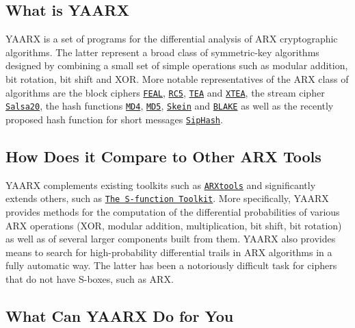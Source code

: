 \hypertarget{index_what_sec}{}\subsection{\-What is Y\-A\-A\-R\-X}\label{index_what_sec}
\-Y\-A\-A\-R\-X is a set of programs for the differential analysis of \-A\-R\-X cryptographic algorithms. \-The latter represent a broad class of symmetric-\/key algorithms designed by combining a small set of simple operations such as modular addition, bit rotation, bit shift and \-X\-O\-R. \-More notable representatives of the \-A\-R\-X class of algorithms are the block ciphers \href{https://en.wikipedia.org/wiki/FEAL}{\tt \-F\-E\-A\-L}, \href{https://en.wikipedia.org/wiki/RC5}{\tt \-R\-C5}, \href{https://en.wikipedia.org/wiki/Tiny_Encryption_Algorithm}{\tt \-T\-E\-A} and \href{https://en.wikipedia.org/wiki/XTEA}{\tt \-X\-T\-E\-A}, the stream cipher \href{https://en.wikipedia.org/wiki/Salsa20}{\tt \-Salsa20}, the hash functions \href{https://en.wikipedia.org/wiki/MD4}{\tt \-M\-D4}, \href{https://en.wikipedia.org/wiki/MD5}{\tt \-M\-D5}, \href{https://en.wikipedia.org/wiki/Skein_%28hash_function%29}{\tt \-Skein} and \href{https://en.wikipedia.org/wiki/BLAKE_%28hash_function%29}{\tt \-B\-L\-A\-K\-E} as well as the recently proposed hash function for short messages \href{https://131002.net/siphash/}{\tt \-Sip\-Hash}.\hypertarget{index_why_sec}{}\subsection{\-How Does it Compare to Other A\-R\-X Tools}\label{index_why_sec}
\-Y\-A\-A\-R\-X complements existing toolkits such as \href{http://www.di.ens.fr/~leurent/arxtools.html}{\tt \-A\-R\-Xtools} and significantly extends others, such as \href{http://www.ecrypt.eu.org/tools/s-function-toolkit}{\tt \-The \-S-\/function \-Toolkit}. \-More specifically, \-Y\-A\-A\-R\-X provides methods for the computation of the differential probabilities of various \-A\-R\-X operations (\-X\-O\-R, modular addition, multiplication, bit shift, bit rotation) as well as of several larger components built from them. \-Y\-A\-A\-R\-X also provides means to search for high-\/probability differential trails in \-A\-R\-X algorithms in a fully automatic way. \-The latter has been a notoriously difficult task for ciphers that do not have \-S-\/boxes, such as \-A\-R\-X.\hypertarget{index_how_sec}{}\subsection{\-What Can Y\-A\-A\-R\-X Do for You}\label{index_how_sec}
